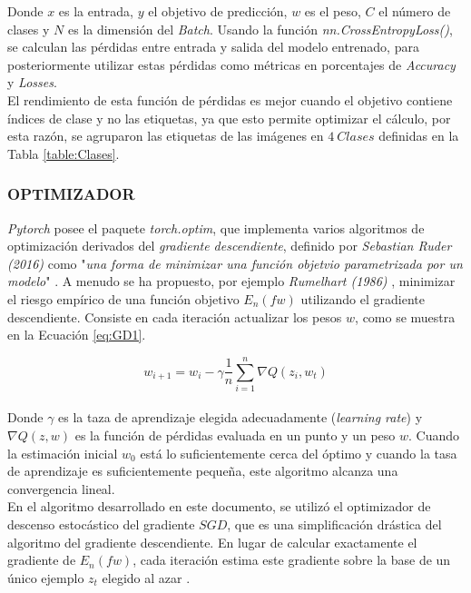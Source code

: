 Donde $x$ es la entrada, $y$ el objetivo de predicción, $w$ es el peso, $C$ el número de clases y $N$ es la dimensión del \textit{Batch}. Usando la función \textit{nn.CrossEntropyLoss()}, se calculan las pérdidas entre entrada y salida del modelo entrenado, para posteriormente utilizar estas pérdidas como métricas en porcentajes de \textit{Accuracy} y \textit{Losses}.\\			

El rendimiento de esta función de pérdidas es mejor cuando el objetivo contiene índices de clase y no las etiquetas, ya que esto permite optimizar el cálculo, por esta razón, se agruparon las etiquetas de las imágenes en $4 \ Clases$ definidas en la Tabla \ref{table:Clases}.

\subsubsection{OPTIMIZADOR}

\textit{Pytorch} posee el paquete \textit{torch.optim}, que implementa varios algoritmos de optimización derivados del \textit{gradiente descendiente}, definido por \textit{Sebastian Ruder (2016)} como "\textit{una forma de minimizar una función objetvio parametrizada por un modelo}" \cite{ruder2016overview}. A menudo se ha propuesto, por ejemplo \textit{Rumelhart (1986)} \cite{rumelhart1986learning}, minimizar el riesgo empírico  de una función objetivo $E_n(fw)$ utilizando el gradiente descendiente. Consiste en cada iteración actualizar los pesos $w$, como se muestra en la Ecuación \ref{eq:GD1}.

\begin{equation}
	\label{eq:GD1}
	{w_{i+1}=w_i-\gamma\frac{1}{n}\sum_{i=1}^{n}\nabla Q(z_i,w_t)}
\end{equation}\\

Donde $\gamma$ es la taza de aprendizaje elegida adecuadamente (\textit{learning rate}) y $\nabla Q(z,w)$ es la función de pérdidas evaluada en un punto y un peso $w$. Cuando la estimación inicial $w_0$ está lo suficientemente cerca del óptimo y cuando la tasa de aprendizaje es suficientemente pequeña, este algoritmo alcanza una convergencia lineal.\\

En el algoritmo desarrollado en este documento, se utilizó el optimizador de descenso estocástico del gradiente $SGD$, que es una simplificación drástica del algoritmo del gradiente descendiente. En lugar de calcular exactamente el gradiente de $E_n(fw)$, cada iteración estima este gradiente sobre la base de un único ejemplo $z_t$ elegido al azar \cite{bottou2012stochastic}.

